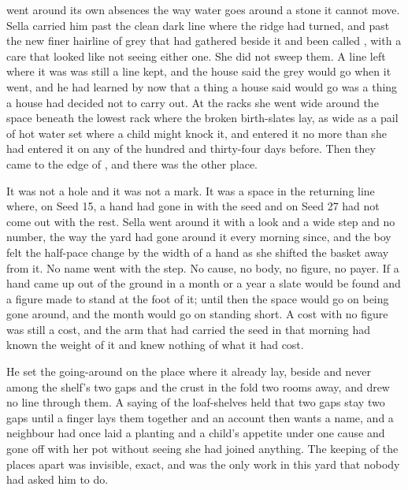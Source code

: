 \scenebreak

 went around its own absences the way water goes around a stone it cannot move. Sella carried him past the clean dark line where the  ridge had turned, and past the new finer hairline of grey that had gathered beside it and been called , with a care that looked like not seeing either one. She did not sweep them. A line left where it was was still a line kept, and the house said the grey would go when it went, and he had learned by now that a thing a house said would go was a thing a house had decided not to carry out. At the racks she went wide around the space beneath the lowest rack where the broken birth-slates lay, as wide as a pail of hot water set where a child might knock it, and entered it no more than she had entered it on any of the hundred and thirty-four days before. Then they came to the edge of , and there was the other place.

It was not a hole and it was not a mark. It was a space in the returning line where, on Seed 15, a hand had gone in with the seed and on Seed 27 had not come out with the rest. Sella went around it with a look and a wide step and no number, the way the yard had gone around it every morning since, and the boy felt the half-pace change by the width of a hand as she shifted the basket away from it. No name went with the step. No cause, no body, no figure, no payer. If a hand came up out of the ground in a month or a year a slate would be found and a figure made to stand at the foot of it; until then the space would go on being gone around, and the month would go on standing short. A cost with no figure was still a cost, and the arm that had carried the seed in that morning had known the weight of it and knew nothing of what it had cost.

He set the going-around on the place where it already lay, beside and never among the shelf's two gaps and the crust in the fold two rooms away, and drew no line through them. A saying of the loaf-shelves held that two gaps stay two gaps until a finger lays them together and an account then wants a name, and a neighbour had once laid a planting and a child's appetite under one cause and gone off with her pot without seeing she had joined anything. The keeping of the places apart was invisible, exact, and was the only work in this yard that nobody had asked him to do.

